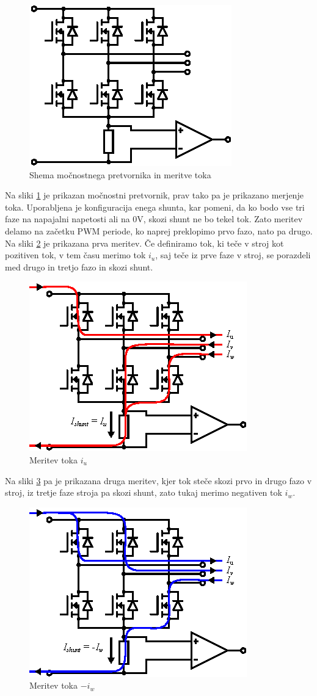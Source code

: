 \documentclass[a4paper,twoside,openright,12pt,slovene]{book}
\begin{document}
\begin{figure}[!htbp]
    \centering
    \includegraphics[width=0.5\columnwidth]{Slike/Inkscape/inverter.eps}
    \caption{\label{inverter} Shema močnostnega pretvornika in meritve toka }
\end{figure}

Na sliki \ref{inverter} je prikazan močnostni pretvornik, prav tako pa je prikazano merjenje toka. Uporabljena je konfiguracija enega shunta, kar pomeni, da ko bodo vse tri faze na napajalni
napetosti ali na 0V, skozi shunt ne bo tekel tok. Zato meritev delamo na začetku PWM periode, ko naprej preklopimo prvo fazo, nato pa drugo. Na sliki \ref{meritevTokaIu} je prikazana prva meritev.
Če definiramo tok, ki teče v stroj kot pozitiven tok, v tem času merimo tok $i_u$, saj teče iz prve faze v stroj, se porazdeli med drugo in tretjo fazo in skozi shunt. 

\begin{figure}[!htbp]
    \centering
    \includegraphics[width=0.5\columnwidth]{Slike/Inkscape/meritevTokaIu.eps}
    \caption{\label{meritevTokaIu} Meritev toka $i_u$ }
\end{figure}

Na sliki \ref{meritevTokaIw} pa je prikazana druga meritev, kjer tok steče skozi prvo in drugo fazo v stroj, iz tretje faze stroja pa skozi shunt, zato tukaj merimo negativen tok $i_w$. 

\begin{figure}[!htbp]
    \centering
    \includegraphics[width=0.5\columnwidth]{Slike/Inkscape/meritevTokaIw.eps}
    \caption{\label{meritevTokaIw} Meritev toka $-i_w$ }
\end{figure}
\end{document}
